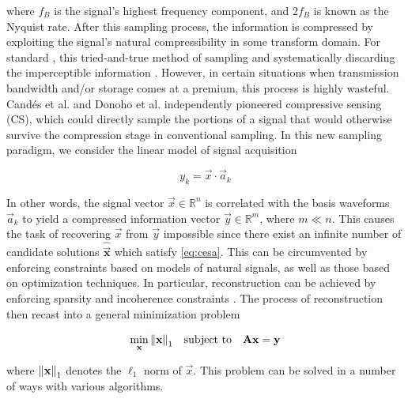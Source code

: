 \documentclass[10pt,a4paper,twoside]{article}
\begin{document}
\noindent where $f_B$ is the signal's highest frequency component, and $2f_B$ is known as the Nyquist rate. After this sampling process, the information is compressed by exploiting the signal's natural compressibility in some transform domain. For standard , this tried-and-true method of sampling and systematically discarding the imperceptible information . However, in certain situations when transmission bandwidth and/or storage comes at a premium, this process is highly wasteful. Cand\'{e}s et al. \cite{Candes2006} and Donoho et al. \cite{Donoho2006} independently pioneered compressive sensing (CS), which could directly sample the portions of a signal that would otherwise survive the compression stage in conventional sampling. In this new sampling paradigm, we consider the linear model of signal acquisition

\begin{equation}\label{eq:cesa}
	y_k = \vec{x} \cdot \vec{a}_k
\end{equation}

In other words, the signal vector $\vec{x} \in \mathbb{R}^n$ is correlated with the basis waveforms $\vec{a}_k$ to yield a compressed information vector $\vec{y} \in \mathbb{R}^m$, where $m \ll n$. This causes the task of recovering $\vec{x}$ from $\vec{y}$ impossible since there exist an infinite number of candidate solutions $\bm\hat{\vec{x}}$ which satisfy \eqref{eq:cesa}. This can be circumvented by enforcing constraints based on models of natural signals, as well as those based on optimization techniques. In particular, reconstruction can be achieved by enforcing sparsity and incoherence constraints \cite{Candes2008b}.  The process of reconstruction  then  recast into a general minimization problem

\begin{equation}\label{eq:minl1}
	\min_{\text{\bfseries x}} \norm{\text{\bfseries x}}_1 \quad \textrm{subject to} \quad \text{\bfseries A}\text{\bfseries x} = \text{\bfseries y}
\end{equation}

\noindent where $\norm{\text{\bfseries x}}_1$ denotes the $\ell_1$ norm of $\vec{x}$. This problem can be solved in a number of ways with various algorithms.
\end{document}
